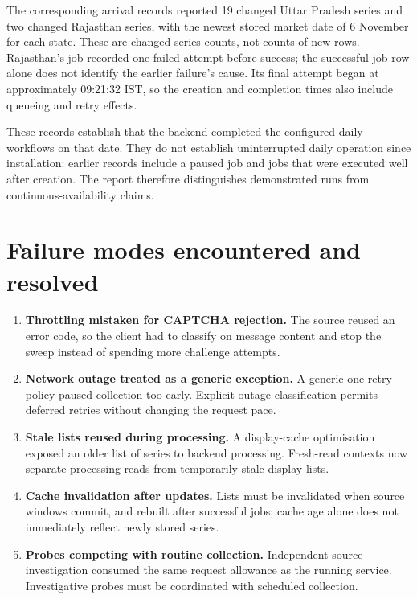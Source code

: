 \documentclass[12pt,a4paper,oneside]{report}
\numberwithin{equation}{chapter}
\numberwithin{figure}{chapter}
\numberwithin{table}{chapter}
\theoremstyle{definition}
\begin{document}
The corresponding arrival records reported 19 changed Uttar Pradesh series and two changed Rajasthan series, with the newest stored market date of 6 November for each state. These are changed-series counts, not counts of new rows. Rajasthan's job recorded one failed attempt before success; the successful job row alone does not identify the earlier failure's cause. Its final attempt began at approximately 09:21:32 IST, so the creation and completion times also include queueing and retry effects.

These records establish that the backend completed the configured daily workflows on that date. They do not establish uninterrupted daily operation since installation: earlier records include a paused job and jobs that were executed well after creation. The report therefore distinguishes demonstrated runs from continuous-availability claims.

\section{Failure modes encountered and resolved}
\label{sec:failures}
\begin{enumerate}
  \item \textbf{Throttling mistaken for CAPTCHA rejection.} The source reused an error code, so the client had to classify on message content and stop the sweep instead of spending more challenge attempts.
  \item \textbf{Network outage treated as a generic exception.} A generic one-retry policy paused collection too early. Explicit outage classification permits deferred retries without changing the request pace.
  \item \textbf{Stale lists reused during processing.} A display-cache optimisation exposed an older list of series to backend processing. Fresh-read contexts now separate processing reads from temporarily stale display lists.
  \item \textbf{Cache invalidation after updates.} Lists must be invalidated when source windows commit, and rebuilt after successful jobs; cache age alone does not immediately reflect newly stored series.
  \item \textbf{Probes competing with routine collection.} Independent source investigation consumed the same request allowance as the running service. Investigative probes must be coordinated with scheduled collection.
\end{enumerate}
\end{document}
